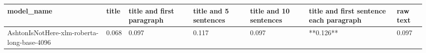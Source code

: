 \begin{tabular}{lllllll}
\toprule
                                model\_name & title & title and first paragraph & title and 5 sentences & title and 10 sentences & title and first sentence each paragraph & raw text \\
\midrule
AshtonIsNotHere-xlm-roberta-long-base-4096 & 0.068 &                     0.097 &                 0.117 &                  0.097 &                               **0.126** &    0.097 \\
\bottomrule
\end{tabular}
